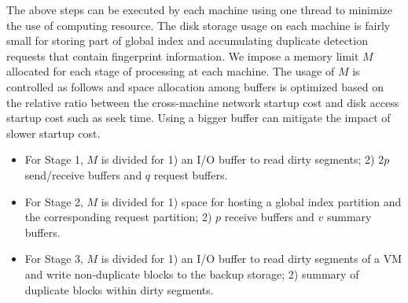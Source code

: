 The above steps can be executed by each machine using one thread to minimize the use of computing resource.
The  disk storage usage on each machine
is fairly small for  storing part of global index and
accumulating  duplicate detection requests that contain fingerprint information.
We impose a memory limit $M$ allocated for each stage of processing at each machine.
The usage of $M$ is controlled as follows and space allocation among buffers is optimized based on the relative
ratio between the cross-machine network  startup cost and disk access startup cost such as seek time.
Using a bigger buffer  can mitigate the impact of slower startup cost.
\begin{itemize}
\item For Stage 1, $M$  is divided for
1) an I/O buffer to read dirty segments; 2) $2p$ send/receive buffers and $q$ request  buffers.

\item
For Stage 2,  $M$  is divided for 1) space for hosting a global index partition and
the corresponding request partition; 2) $p$ receive buffers and $v$ summary buffers.

\item For Stage 3, $M$  is divided for 1) an I/O buffer to read dirty segments of a VM and
write non-duplicate blocks to the  backup storage;
2) summary of duplicate blocks within dirty segments.
\end{itemize}

